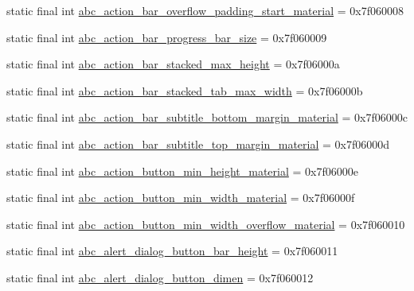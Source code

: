 \begin{DoxyCompactItemize}
\item 
static final int \mbox{\hyperlink{classcom_1_1synnapps_1_1carouselview_1_1_r_1_1dimen_a7ffb899f535453b37f7933677c08c4a1}{abc\+\_\+action\+\_\+bar\+\_\+overflow\+\_\+padding\+\_\+start\+\_\+material}} = 0x7f060008
\item 
static final int \mbox{\hyperlink{classcom_1_1synnapps_1_1carouselview_1_1_r_1_1dimen_a0aefe65880ddd14ea0c77fbee48cdf85}{abc\+\_\+action\+\_\+bar\+\_\+progress\+\_\+bar\+\_\+size}} = 0x7f060009
\item 
static final int \mbox{\hyperlink{classcom_1_1synnapps_1_1carouselview_1_1_r_1_1dimen_a19757677400f804ac645612ecdadf0ee}{abc\+\_\+action\+\_\+bar\+\_\+stacked\+\_\+max\+\_\+height}} = 0x7f06000a
\item 
static final int \mbox{\hyperlink{classcom_1_1synnapps_1_1carouselview_1_1_r_1_1dimen_a93a7ad74391c85387e71c01edada584d}{abc\+\_\+action\+\_\+bar\+\_\+stacked\+\_\+tab\+\_\+max\+\_\+width}} = 0x7f06000b
\item 
static final int \mbox{\hyperlink{classcom_1_1synnapps_1_1carouselview_1_1_r_1_1dimen_a056bfa3b90de97f1a925953d1d34adfc}{abc\+\_\+action\+\_\+bar\+\_\+subtitle\+\_\+bottom\+\_\+margin\+\_\+material}} = 0x7f06000c
\item 
static final int \mbox{\hyperlink{classcom_1_1synnapps_1_1carouselview_1_1_r_1_1dimen_abc61bc8993e4aa8a5ae233322a411cf6}{abc\+\_\+action\+\_\+bar\+\_\+subtitle\+\_\+top\+\_\+margin\+\_\+material}} = 0x7f06000d
\item 
static final int \mbox{\hyperlink{classcom_1_1synnapps_1_1carouselview_1_1_r_1_1dimen_a331b333d5c6d91c0ca53aeee97738ae1}{abc\+\_\+action\+\_\+button\+\_\+min\+\_\+height\+\_\+material}} = 0x7f06000e
\item 
static final int \mbox{\hyperlink{classcom_1_1synnapps_1_1carouselview_1_1_r_1_1dimen_abf78f15769eab1a2e29e673c0017d6a6}{abc\+\_\+action\+\_\+button\+\_\+min\+\_\+width\+\_\+material}} = 0x7f06000f
\item 
static final int \mbox{\hyperlink{classcom_1_1synnapps_1_1carouselview_1_1_r_1_1dimen_a64be8b1708976624d174fee3aac074bc}{abc\+\_\+action\+\_\+button\+\_\+min\+\_\+width\+\_\+overflow\+\_\+material}} = 0x7f060010
\item 
static final int \mbox{\hyperlink{classcom_1_1synnapps_1_1carouselview_1_1_r_1_1dimen_a394ce62c9c5ed57abae21d744cbd6a82}{abc\+\_\+alert\+\_\+dialog\+\_\+button\+\_\+bar\+\_\+height}} = 0x7f060011
\item 
static final int \mbox{\hyperlink{classcom_1_1synnapps_1_1carouselview_1_1_r_1_1dimen_ae3dd54e4ac07292c5fe5678b9db845ff}{abc\+\_\+alert\+\_\+dialog\+\_\+button\+\_\+dimen}} = 0x7f060012

\end{DoxyCompactItemize}
